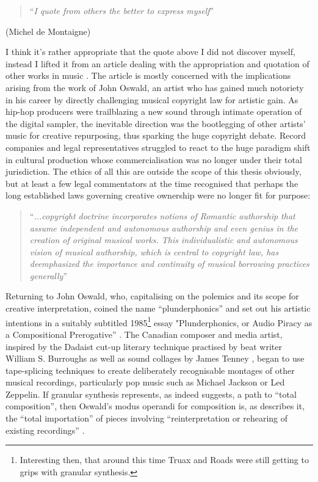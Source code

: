 \blockquote{``\textit{I quote from others the better to express myself}''}

\begin{flushright}
(Michel de Montaigne)
\end{flushright}

I think it's rather appropriate that the quote above I did not discover myself, instead I lifted it from an article dealing with the appropriation and quotation of other works in music \citep{Holm-Hudson1997}. The article is mostly concerned with the implications arising from the work of John Oswald, an artist who has gained much notoriety in his career by directly challenging musical copyright law for artistic gain. As hip-hop producers were trailblazing a new sound through intimate operation of the digital sampler, the inevitable direction was the bootlegging of other artists' music for creative repurposing, thus sparking the huge copyright debate. Record companies and legal representatives struggled to react to the huge paradigm shift in cultural production whose commercialisation was no longer under their total jurisdiction. The ethics of all this are outside the scope of this thesis obviously, but at least a few legal commentators at the time recognised that perhaps the long established laws governing creative ownership were no longer fit for purpose:

\blockcquote[]{Arewa1979}{``\textit{...copyright doctrine incorporates notions of Romantic authorship that assume independent and autonomous authorship and even genius in the creation of original musical works. This individualistic and autonomous vision of musical authorship, which is central to copyright law, has deemphasized the importance and continuity of musical borrowing practices generally}''}

Returning to John Oswald, who, capitalising on the polemics and its scope for creative interpretation, coined the name ``plunderphonics'' and set out his artistic intentions in a suitably subtitled 1985\footnote{Interesting then, that around this time Truax and Roads were still getting to grips with granular synthesis.} essay "Plunderphonics, or Audio Piracy as a Compositional Prerogative” \citep{Oswald1985}. The Canadian composer and media artist, inspired by the Dadaist cut-up literary technique practised by beat writer William S. Burroughs as well as sound collages by James Tenney \citep{Cox2004}, began to use tape-splicing techniques to create deliberately recognisable montages of other musical recordings, particularly pop music such as Michael Jackson or Led Zeppelin. If granular synthesis represents, as \cite{Thomson2004} indeed suggests,  a path to ``total composition'', then Oswald's modus operandi for composition is, as \cite{Holm-Hudson1997} describes it, the ``total importation'' of pieces involving ``reinterpretation or rehearing of existing recordings'' \citep{Cutler1994}.

